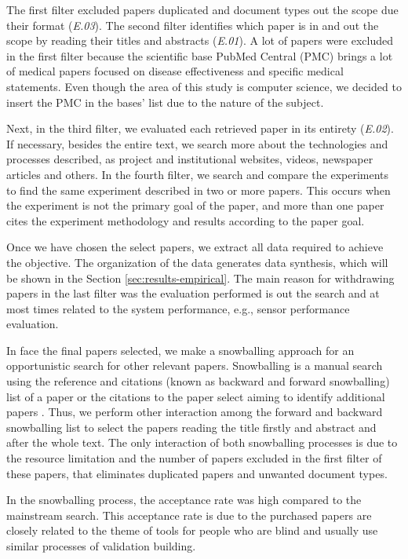 The first filter excluded papers duplicated and document types out the scope due their format (\textit{E.03}). The second filter identifies which paper is in and out the scope by reading their titles and abstracts (\textit{E.01}). A lot of papers were excluded in the first filter because the scientific base PubMed Central (PMC) brings a lot of medical papers focused on disease effectiveness and specific medical statements. Even though the area of this study is computer science, we decided to insert the PMC in the bases’ list due to the nature of the subject. 

Next, in the third filter, we evaluated each retrieved paper in its entirety (\textit{E.02}). If necessary, besides the entire text, we search more about the technologies and processes described, as project and institutional websites, videos, newspaper articles and others. In the fourth filter, we search and compare the experiments to find the same experiment described in two or more papers. This occurs when the experiment is not the primary goal of the paper, and more than one paper cites the experiment methodology and results according to the paper goal.

Once we have chosen the select papers, we extract all data required to achieve the objective. The organization of the data generates data synthesis, which will be shown in the Section \ref{sec:results-empirical}. The main reason for withdrawing papers in the last filter was the evaluation performed is out the search and at most times related to the system performance, e.g., sensor performance evaluation. 

In face the final papers selected, we make a snowballing approach for an opportunistic search for other relevant papers. Snowballing is a manual search using the reference and citations (known as backward and forward snowballing) list of a paper or the citations to the paper select aiming to identify additional papers \cite{Wohlin2014}. Thus, we perform other interaction among the forward and backward snowballing list to select the papers reading the title firstly and abstract and after the whole text. The only interaction of both snowballing processes is due to the resource limitation and the number of papers excluded in the first filter of these papers, that eliminates duplicated papers and unwanted document types.


In the snowballing process, the acceptance rate was high compared to the mainstream search. This acceptance rate is due to the purchased papers are closely related to the theme of tools for people who are blind and usually use similar processes of validation building.


